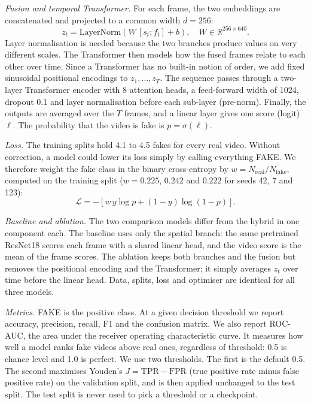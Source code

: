 \documentclass[conference]{IEEEtran}
\begin{document}
\textit{Fusion and temporal Transformer.} For each frame, the two embeddings
are concatenated and projected to a common width $d=256$:
\begin{equation}
z_t=\mathrm{LayerNorm}\!\left(W\,[s_t;f_t]+b\right),\quad
W\in\mathbb{R}^{256\times640}.
\end{equation}
Layer normalisation is needed because the two branches produce values on
very different scales. The Transformer then models how the fused frames
relate to each other over time. Since a Transformer has no built-in notion of
order, we add fixed sinusoidal positional encodings \cite{vaswani2017attention}
to $z_1,\dots,z_T$. The sequence passes through a two-layer Transformer
encoder with 8 attention heads, a feed-forward width of 1024, dropout 0.1 and
layer normalisation before each sub-layer (pre-norm). Finally, the outputs
are averaged over the $T$ frames, and a linear layer gives one score
(logit) $\ell$. The probability that the video is fake is
$p=\sigma(\ell)$.

\textit{Loss.} The training splits hold 4.1 to 4.5 fakes for every real
video. Without correction, a model could lower its loss simply by calling
everything FAKE. We therefore weight the fake class in the binary
cross-entropy by $w=N_{\mathrm{real}}/N_{\mathrm{fake}}$, computed on the
training split ($w=0.225$, $0.242$ and $0.222$ for seeds 42, 7 and 123):
\begin{equation}
\mathcal{L}=-\left[w\,y\log p+(1-y)\log(1-p)\right].
\end{equation}

\textit{Baseline and ablation.} The two comparison models differ from the
hybrid in one component each. The baseline uses only the spatial branch: the
same pretrained ResNet18 scores each frame with a shared linear head, and the
video score is the mean of the frame scores. The ablation keeps both branches
and the fusion but removes the positional encoding and the Transformer; it
simply averages $z_t$ over time before the linear head. Data, splits, loss and
optimiser are identical for all three models.

\textit{Metrics.} FAKE is the positive class. At a given decision threshold
we report accuracy, precision, recall, F1 and the confusion matrix. We also
report ROC-AUC, the area under the receiver operating characteristic curve.
It measures how well a model ranks fake videos above real ones, regardless of
threshold: 0.5 is chance level and 1.0 is perfect. We use two thresholds.
The first is the default 0.5. The second maximises Youden's
$J=\mathrm{TPR}-\mathrm{FPR}$ (true positive rate minus false positive rate)
on the validation split, and is then applied unchanged to the test split. The
test split is never used to pick a threshold or a checkpoint.
\end{document}
